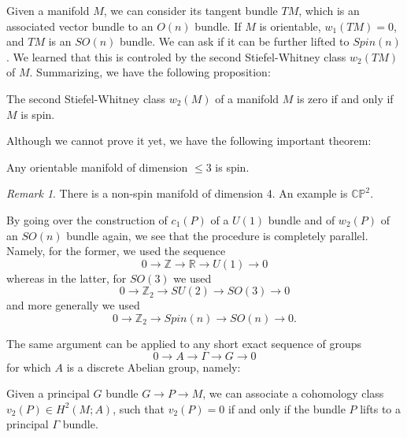 \documentclass[12pt]{article}
\numberwithin{equation}{section}
\theoremstyle{remark}
\newtheorem{remark}[definition]{Remark}
\def\bR{\mathbb{R}}
\def\bZ{\mathbb{Z}}
\def\CP{\mathbb{CP}}
\begin{document}
Given a manifold $M$, we can consider its tangent bundle $TM$, which is an associated vector bundle to an $O(n)$ bundle.
If $M$ is orientable, $w_1(TM)=0$, and $TM$ is an $SO(n)$ bundle.
We can ask if it can be further lifted to $Spin(n)$.
We learned that this is controled by the second Stiefel-Whitney class $w_2(TM)$ of $M$.
Summarizing, we have the following proposition:
\begin{proposition}
The second Stiefel-Whitney class $w_2(M)$ of a manifold $M$ is zero if and only if $M$ is spin.
\end{proposition}

Although we cannot prove it yet, we have the following important theorem:
\begin{theorem}
Any orientable manifold of dimension $\leq 3$ is spin.
\end{theorem}

\begin{remark}
There is a non-spin manifold of dimension 4. An example is $\CP^2$.
\end{remark}


By going over the construction of $c_1(P)$ of a $U(1)$ bundle and 
of $w_2(P)$ of an $SO(n)$ bundle again,
we see that the procedure is completely parallel.
Namely, for the former, we used the sequence \begin{equation}
0\to \bZ\to \bR \to U(1)\to 0 
\end{equation} whereas in the latter, for $SO(3)$ we used \begin{equation}
0\to \bZ_2\to SU(2)\to SO(3)\to 0
\end{equation} and more generally we used \begin{equation}
0\to \bZ_2\to Spin(n)\to SO(n)\to 0.
\end{equation}

The same argument can be applied to any short exact sequence of groups \begin{equation}
0\to A\to \Gamma \to G\to 0
\end{equation} for which $A$ is a discrete Abelian group,
namely:
\begin{proposition}
  Given a principal $G$ bundle $G\to P\to M$,
  we can associate a cohomology class $v_2(P)\in H^2(M;A)$,
  such that $v_2(P)=0$ if and only if the bundle $P$ lifts to a principal $\Gamma$ bundle.
\end{proposition}
\end{document}
